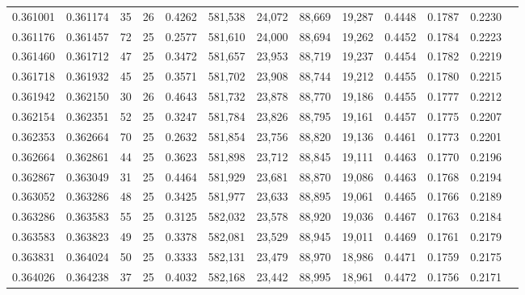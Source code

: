 \begin{tabular}{rrrrrrrrrrrrr}
0.361001 & 0.361174 &    35 &  26 &                                     0.4262 & 581,538 &  24,072 &  88,669 &  19,287 & 0.4448 & 0.1787 & 0.2230 \\
0.361176 & 0.361457 &    72 &  25 &                                     0.2577 & 581,610 &  24,000 &  88,694 &  19,262 & 0.4452 & 0.1784 & 0.2223 \\
0.361460 & 0.361712 &    47 &  25 &                                     0.3472 & 581,657 &  23,953 &  88,719 &  19,237 & 0.4454 & 0.1782 & 0.2219 \\
0.361718 & 0.361932 &    45 &  25 &                                     0.3571 & 581,702 &  23,908 &  88,744 &  19,212 & 0.4455 & 0.1780 & 0.2215 \\
0.361942 & 0.362150 &    30 &  26 &                                     0.4643 & 581,732 &  23,878 &  88,770 &  19,186 & 0.4455 & 0.1777 & 0.2212 \\
0.362154 & 0.362351 &    52 &  25 &                                     0.3247 & 581,784 &  23,826 &  88,795 &  19,161 & 0.4457 & 0.1775 & 0.2207 \\
0.362353 & 0.362664 &    70 &  25 &                                     0.2632 & 581,854 &  23,756 &  88,820 &  19,136 & 0.4461 & 0.1773 & 0.2201 \\
0.362664 & 0.362861 &    44 &  25 &                                     0.3623 & 581,898 &  23,712 &  88,845 &  19,111 & 0.4463 & 0.1770 & 0.2196 \\
0.362867 & 0.363049 &    31 &  25 &                                     0.4464 & 581,929 &  23,681 &  88,870 &  19,086 & 0.4463 & 0.1768 & 0.2194 \\
0.363052 & 0.363286 &    48 &  25 &                                     0.3425 & 581,977 &  23,633 &  88,895 &  19,061 & 0.4465 & 0.1766 & 0.2189 \\
0.363286 & 0.363583 &    55 &  25 &                                     0.3125 & 582,032 &  23,578 &  88,920 &  19,036 & 0.4467 & 0.1763 & 0.2184 \\
0.363583 & 0.363823 &    49 &  25 &                                     0.3378 & 582,081 &  23,529 &  88,945 &  19,011 & 0.4469 & 0.1761 & 0.2179 \\
0.363831 & 0.364024 &    50 &  25 &                                     0.3333 & 582,131 &  23,479 &  88,970 &  18,986 & 0.4471 & 0.1759 & 0.2175 \\
0.364026 & 0.364238 &    37 &  25 &                                     0.4032 & 582,168 &  23,442 &  88,995 &  18,961 & 0.4472 & 0.1756 & 0.2171 \\

\end{tabular}
